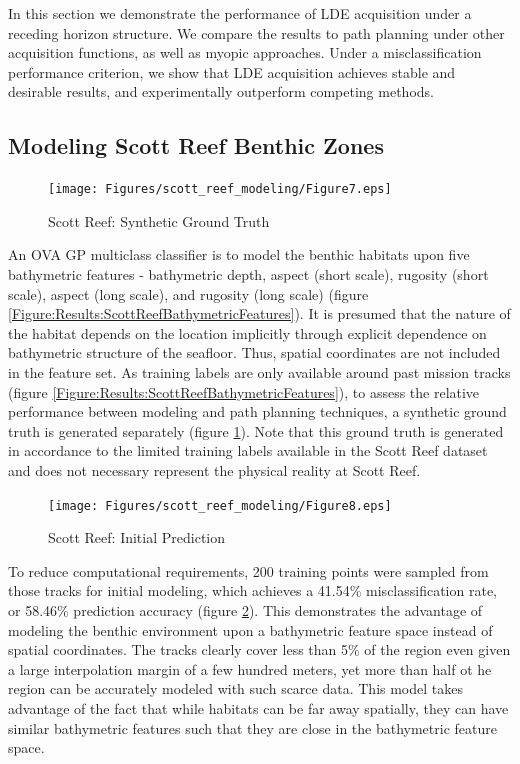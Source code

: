 \documentclass{article}
\begin{document}
	In this section we demonstrate the performance of LDE acquisition under a receding horizon structure. We compare the results to path planning under other acquisition functions, as well as myopic approaches. Under a misclassification performance criterion, we show that LDE acquisition achieves stable and desirable results, and experimentally outperform competing methods.
	
	\subsection{Modeling Scott Reef Benthic Zones}

		\begin{figure}[!htbp]
		\fontsize{24}{12}\selectfont
		\centering
			\texttt{[image: Figures/scott\_reef\_modeling/Figure7.eps]}
		\caption{Scott Reef: Synthetic Ground Truth}
		\label{Figure:Results:ScottReefSyntheticGroundTruth}
		\end{figure}
		
		An OVA GP multiclass classifier is to model the benthic habitats upon five bathymetric features - bathymetric depth, aspect (short scale), rugosity (short scale), aspect (long scale), and rugosity (long scale) (figure \ref{Figure:Results:ScottReefBathymetricFeatures}). It is presumed that the nature of the habitat depends on the location implicitly through explicit dependence on bathymetric structure of the seafloor. Thus, spatial coordinates are not included in the feature set. As training labels are only available around past mission tracks (figure \ref{Figure:Results:ScottReefBathymetricFeatures}), to assess the relative performance between modeling and path planning techniques, a synthetic ground truth is generated separately (figure \ref{Figure:Results:ScottReefSyntheticGroundTruth}). Note that this ground truth is generated in accordance to the limited training labels available in the Scott Reef dataset and does not necessary represent the physical reality at Scott Reef. 

		\begin{figure}[!htbp]
		\centering
			\texttt{[image: Figures/scott\_reef\_modeling/Figure8.eps]}
		\caption{Scott Reef: Initial Prediction}
		\label{Figure:Results:ScottReefInitialPredictions}
		\end{figure}
				
		To reduce computational requirements, 200 training points were sampled from those tracks for initial modeling, which achieves a 41.54\% misclassification rate, or 58.46\% prediction accuracy (figure \ref{Figure:Results:ScottReefInitialPredictions}). This demonstrates the advantage of modeling the benthic environment upon a bathymetric feature space instead of spatial coordinates. The tracks clearly cover less than 5\% of the region even given a large interpolation margin of a few hundred meters, yet more than half ot he region can be accurately modeled with such scarce data. This model takes advantage of the fact that while habitats can be far away spatially, they can have similar bathymetric features such that they are close in the bathymetric feature space.
\end{document}

